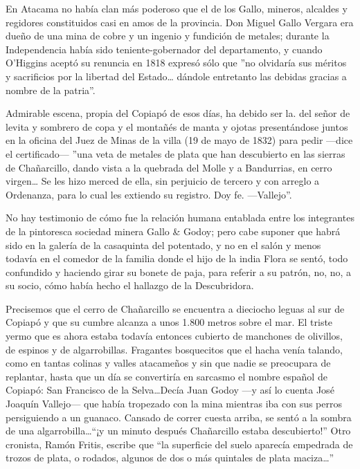 \documentclass[10pt,twoside,openright]{memoir}
\begin{document}
En Atacama no había clan más poderoso que el de los Gallo, mineros,
alcaldes y regidores constituidos casi en amos de la provincia. Don
Miguel Gallo Vergara era dueño de una mina de cobre y un ingenio y
fundición de metales; durante la Independencia había sido
teniente-gobernador del departamento, y cuando O'Higgins aceptó su
renuncia en 1818 expresó sólo que ''no olvidaría sus méritos y
sacrificios por la libertad del Estado\ldots{} dándole entretanto las
debidas gracias a nombre de la patria''.

Admirable escena, propia del Copiapó de esos días, ha debido ser la. del
señor de levita y sombrero de copa y el montañés de manta y ojotas
presentándose juntos en la oficina del Juez de Minas de la villa (19 de
mayo de 1832) para pedir ---dice el certificado--- ''una veta de metales
de plata que han descubierto en las sierras de Chañarcillo, dando vista
a la quebrada del Molle y a Bandurrias, en cerro virgen\ldots{} Se les
hizo merced de ella, sin perjuicio de tercero y con arreglo a Ordenanza,
para lo cual les extiendo su registro. Doy fe. ---Vallejo''.

No hay testimonio de cómo fue la relación humana entablada entre los
integrantes de la pintoresca sociedad minera Gallo \& Godoy; pero cabe
suponer que habrá sido en la galería de la casaquinta del potentado, y
no en el salón y menos todavía en el comedor de la familia donde el hijo
de la india Flora se sentó, todo confundido y haciendo girar su bonete
de paja, para referir a su patrón, no, no, a su socio, cómo había hecho
el hallazgo de la Descubridora.

Precisemos que el cerro de Chañarcillo se encuentra a dieciocho leguas
al sur de Copiapó y que su cumbre alcanza a unos 1.800 metros sobre el
mar. El triste yermo que es ahora estaba todavía entonces cubierto de
manchones de olivillos, de espinos y de algarrobillas. Fragantes
bosquecitos que el hacha venía talando, como en tantas colinas y valles
atacameños y sin que nadie se preocupara de replantar, hasta que un día
se convertiría en sarcasmo el nombre español de Copiapó: San Francisco
de la Selva\ldots Decía Juan Godoy ---y así lo cuenta José Joaquín
Vallejo--- que había tropezado con la mina mientras iba con sus perros
persiguiendo a un guanaco. Cansado de correr cuesta arriba, se sentó a
la sombra de una algarrobilla\ldots ``¡y un minuto después Chañarcillo
estaba descubierto!'' Otro cronista, Ramón Fritis, escribe que ``la
superficie del suelo aparecía empedrada de trozos de plata, o rodados,
algunos de dos o más quintales de plata maciza\ldots''
\end{document}
